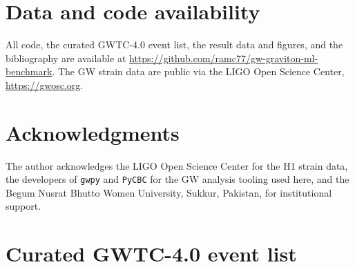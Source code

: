 \documentclass[11pt,a4paper]{article}
\begin{document}
\section*{Data and code availability}

All code, the curated GWTC-4.0 event list, the result data and figures,
and the bibliography are available at
\url{https://github.com/ramc77/gw-graviton-ml-benchmark}. The GW strain
data are public via the LIGO Open Science Center, \url{https://gwosc.org}.

\section*{Acknowledgments}

The author acknowledges the LIGO Open Science Center for the H1 strain
data, the developers of \texttt{gwpy} and \texttt{PyCBC} for the GW
analysis tooling used here, and the Begum Nusrat Bhutto Women
University, Sukkur, Pakistan, for institutional support.




\appendix

\section{Curated GWTC-4.0 event list}\label{app:catalog}
\end{document}
